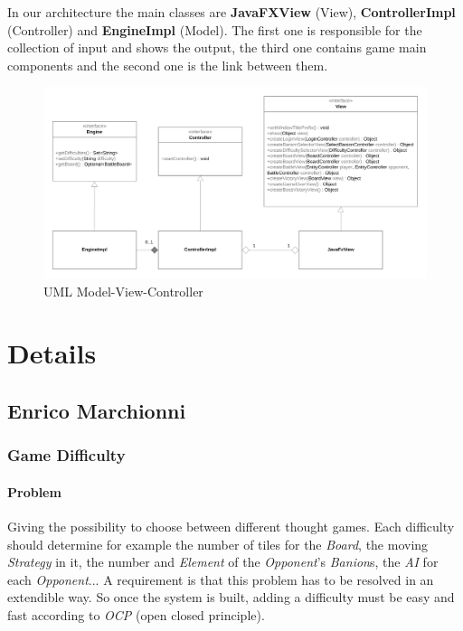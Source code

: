 \documentclass[12pt, a4paper]{report}
\theoremstyle{definition}
\begin{document}
    In our architecture the main classes are \textbf{JavaFXView} (View), \textbf{ControllerImpl} (Controller) and \textbf{EngineImpl} (Model). The
    first one is responsible for the collection of input and shows the output, the third one contains game main components and the second one is the link between them.

    \begin{figure}[ht]
    \centering{}
    \includegraphics[width=12cm]{MVC_main_classes}
    \caption{UML Model-View-Controller}
    \end{figure}

\section{Details}

    \subsection*{Enrico Marchionni}

        \subsubsection{Game Difficulty}

            \paragraph{Problem}
            
            Giving the possibility to choose between different thought games.
            Each difficulty should determine for example the number of tiles for the \emph{Board}, the moving \emph{Strategy} in it,
            the number and \emph{Element} of the \emph{Opponent}'s \emph{Banion}s, the \emph{AI} for each \emph{Opponent}...
            A requirement is that this problem has to be resolved in an extendible way.
            So once the system is built, adding a difficulty must be easy and fast according to \emph{OCP} (open closed principle).
\end{document}
